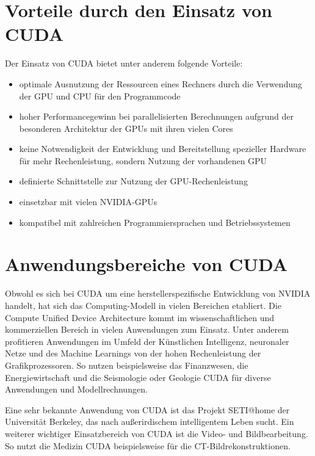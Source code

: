 \section{Vorteile durch den Einsatz von CUDA}

Der Einsatz von CUDA bietet unter anderem folgende Vorteile:

\begin{itemize}
	\item optimale Ausnutzung der Ressourcen eines Rechners durch die Verwendung der GPU und CPU für den Programmcode
	\item hoher Performancegewinn bei parallelisierten Berechnungen aufgrund der besonderen Architektur der GPUs mit ihren vielen Cores
	\item keine Notwendigkeit der Entwicklung und Bereitstellung spezieller Hardware für mehr Rechenleistung, sondern Nutzung der vorhandenen GPU
	\item definierte Schnittstelle zur Nutzung der GPU-Rechenleistung
	\item einsetzbar mit vielen NVIDIA-GPUs
	\item kompatibel mit zahlreichen Programmiersprachen und Betriebssystemen
\end{itemize}



\section{Anwendungsbereiche von CUDA}

Obwohl es sich bei CUDA um eine herstellerspezifische Entwicklung von NVIDIA handelt, hat sich das Computing-Modell in vielen Bereichen etabliert. Die Compute Unified Device Architecture kommt im wissenschaftlichen und kommerziellen Bereich in vielen Anwendungen zum Einsatz. Unter anderem profitieren Anwendungen im Umfeld der Künstlichen Intelligenz, neuronaler Netze und des Machine Learnings von der hohen Rechenleistung der Grafikprozessoren. So nutzen beispielsweise das Finanzwesen, die Energiewirtschaft und die Seismologie oder Geologie CUDA für diverse Anwendungen und Modellrechnungen. 

Eine sehr bekannte Anwendung von CUDA ist das Projekt SETI@home der Universität Berkeley, das nach außerirdischem intelligentem Leben sucht. Ein weiterer wichtiger Einsatzbereich von CUDA ist die Video- und Bildbearbeitung. So nutzt die Medizin CUDA beispielsweise für die CT-Bildrekonstruktionen.



